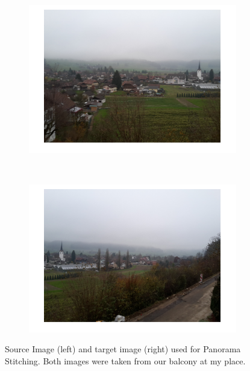 \documentclass{paper}
\begin{document}
\begin{figure}[H]
    \centering
    \begin{subfigure}{0.45\textwidth}
        \includegraphics[width=\textwidth]{stitching/left_input_1}
    \end{subfigure}
    ~
        \begin{subfigure}{0.45\textwidth}
        \includegraphics[width=\textwidth]{stitching/right_input_1}
    \end{subfigure}
    
    \caption{Source Image (left) and target image (right) used for Panorama Stitching. Both images were taken from our balcony at my place.}
    \label{fig:stitching_input}       
\end{figure}
\end{document}

